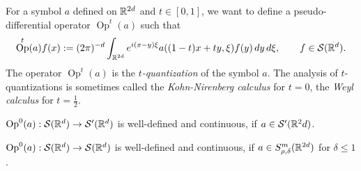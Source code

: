 \documentclass{../../large}
\DeclareMathOperator{\Op}{Op}
\begin{document}
\begin{prb}[Quantization]
For a symbol $a$ defined on $\mathbb{R}^{2d}$ and $t\in[0,1]$, we want to define a pseudo-differential operator $\Op^t(a)$ such that
\[\Op^t(a)f(x):=(2\pi)^{-d}\int_{\R^{2d}}e^{i(x-y)\xi}a((1-t)x+ty,\xi)f(y)\,dy\,d\xi,\qquad f\in\cS(\R^d).\]
The operator $\Op^t(a)$ is the \emph{$t$-quantization} of the symbol $a$.
The analysis of $t$-quantizations is sometimes called the \emph{Kohn-Nirenberg calculus} for $t=0$, the \emph{Weyl calculus} for $t=\frac12$.
\begin{parts}
\item $\Op^0(a):\cS(\R^d)\to\cS'(\R^d)$ is well-defined and continuous, if $a\in\mathcal{S}'(\mathbb{R}^2d)$.
\item $\Op^0(a):\cS(\R^d)\to\cS(\R^d)$ is well-defined and continuous, if $a\in S_{\rho,\delta}^m(\mathbb{R}^{2d})$ for $\delta\le1$.
\end{parts}
\end{prb}
\end{document}
